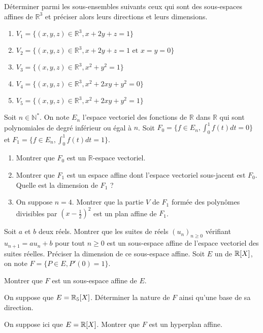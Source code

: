\be
D\'eterminer parmi les sous-ensembles suivants ceux qui sont des sous-espaces affines de $\mathbb R^3$  et pr\'eciser alors leurs directions et leurs dimensions.
\begin{enumerate}
  \item $V_1=\{(x,y,z)\in\mathbb R^3, x+2y+z=1\}$
  \item $V_2=\{(x,y,z)\in\mathbb R^3, x+2y+z=1 \text{ et } x=y=0\}$
  \item  $V_3=\{(x,y,z)\in\mathbb R^3, x^2+y^2=1\}$
  \item  $V_4=\{(x,y,z)\in\mathbb R^3, x^2+2xy+y^2=0\}$ 
  \item $V_5=\{(x,y,z)\in\mathbb R^3, x^2+2xy+y^2=1\}$ 
\end{enumerate}
\ee

\medskip
\be
Soit $n\in\mathbb N^*$. On note $E_n$ l'espace vectoriel des fonctions de $\mathbb R$ dans $\mathbb R$ qui sont polynomiales de degr\'e inf\'erieur ou \'egal \`a $n$. Soit 
$F_0=\{f\in E_n,\int_0^1 f(t) d t=0 \}$ et $F_1=\{f\in E_n,\int_0^1 f(t) d t=1 \}$.
\begin{enumerate}
  \item Montrer que $F_0$ est un $\mathbb R$-espace vectoriel.
  \item Montrer que $F_1$ est un espace affine dont l'espace vectoriel sous-jacent est $F_0$. Quelle est la dimension de $F_1$ ?
  \item On suppose $n=4$. Montrer que la partie $V$ de $F_1$ form\'ee des polynômes divisibles par $\left(x-\frac{1}{2}\right)^2$ est un plan affine de $F_1$.
\end{enumerate}
\ee
\medskip
\be
Soit $a$ et $b$ deux r\'eels. Montrer que les suites de r\'eels $(u_n)_{n\geq
0}$ v\'erifiant $u_{n+1}=au_n+b$ pour tout $n\geq 0$ est un sous-espace
affine de l'espace vectoriel des suites r\'eelles. Pr\'eciser la dimension de
ce sous-espace affine. 
\ee
\medskip
\be
Soit $E$ un \sev de $\mathbb{R}[X]$, on note $F=\{P\in E, P'(0)=1\}$. 
\ben
\item Montrer que $F$ est un sous-espace affine de $E$. 
\item On suppose que $E=\mathbb{R}_5[X]$. D\'eterminer la nature de $F$ ainsi qu'une base de sa direction.
\item On suppose ici que $E=\mathbb{R}[X]$. Montrer que $F$ est un hyperplan affine. 
\een
\ee
\medskip
\newpage
